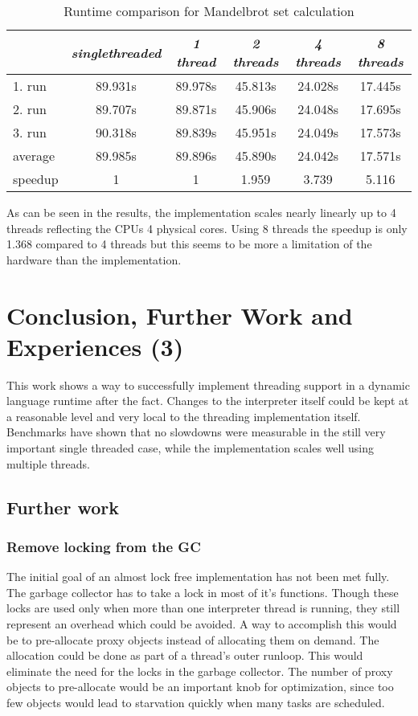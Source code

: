 \documentclass[bachelor,english]{hgbthesis}
\begin{document}
\begin{table}
\caption{Runtime comparison for Mandelbrot set calculation}
\label{benchmark:mandel}
\begin{tabular}{|l||c||c|c|c|c|} \hline
& \emph{singlethreaded} & \emph{1 thread} & \emph{2 threads} & \emph{4 threads} & \emph{8 threads} \\
\hline
1. run  & 89.931s & 89.978s & 45.813s & 24.028s & 17.445s \\
\hline
2. run  & 89.707s & 89.871s & 45.906s & 24.048s & 17.695s \\
\hline
3. run  & 90.318s & 89.839s & 45.951s & 24.049s & 17.573s \\
\hline
average & 89.985s & 89.896s & 45.890s & 24.042s & 17.571s  \\
\hline
speedup & 1       &  1      &  1.959  &  3.739  &  5.116  \\
\hline
\end{tabular}
\end{table}

As can be seen in the results, the implementation scales nearly linearly up to 4 threads reflecting the CPUs 4 physical cores. Using 8 threads the speedup is only 1.368 compared to 4 threads but this seems to be more a limitation of the hardware than the implementation.

\chapter{Conclusion, Further Work and Experiences (3)}

This work shows a way to successfully implement threading support in a dynamic language runtime after the fact. Changes to the interpreter itself could be kept at a reasonable level and very local to the threading implementation itself. Benchmarks have shown that no slowdowns were measurable in the still very important single threaded case, while the implementation scales well using multiple threads.

\section{Further work}

\subsection{Remove locking from the GC}

The initial goal of an almost lock free implementation has not been met fully. The garbage collector has to take a lock in most of it's functions. Though these locks are used only when more than one interpreter thread is running, they still represent an overhead which could be avoided. A way to accomplish this would be to pre-allocate proxy objects instead of allocating them on demand. The allocation could be done as part of a thread's outer runloop. This would eliminate the need for the locks in the garbage collector. The number of proxy objects to pre-allocate would be an important knob for optimization, since too few objects would lead to starvation quickly when many tasks are scheduled.
\end{document}

